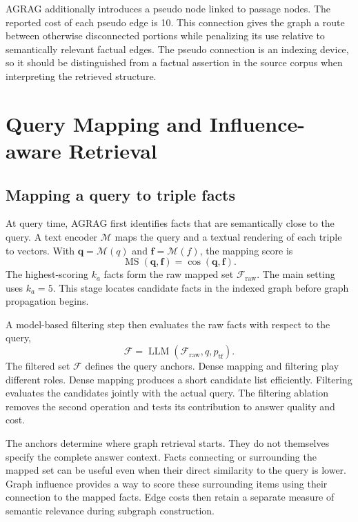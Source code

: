 AGRAG additionally introduces a pseudo node linked to passage nodes. The reported cost of each pseudo edge is 10. This connection gives the graph a route between otherwise disconnected portions while penalizing its use relative to semantically relevant factual edges. The pseudo connection is an indexing device, so it should be distinguished from a factual assertion in the source corpus when interpreting the retrieved structure.

\section{Query Mapping and Influence-aware Retrieval}
\label{sec:agrag:influence}
\subsection{Mapping a query to triple facts}
At query time, AGRAG first identifies facts that are semantically close to the query. A text encoder $\mathcal{M}$ maps the query and a textual rendering of each triple to vectors. With $\mathbf{q}=\mathcal{M}(q)$ and $\mathbf{f}=\mathcal{M}(f)$, the mapping score is
\begin{equation}
\operatorname{MS}(\mathbf{q},\mathbf{f})=
\cos(\mathbf{q},\mathbf{f}).
\label{eq:agrag:mapping}
\end{equation}
The highest-scoring $k_a$ facts form the raw mapped set $\mathcal{F}_{\mathrm{raw}}$. The main setting uses $k_a=5$. This stage locates candidate facts in the indexed graph before graph propagation begins.

A model-based filtering step then evaluates the raw facts with respect to the query,
\begin{equation}
\mathcal{F}=\operatorname{LLM}(\mathcal{F}_{\mathrm{raw}},q,p_{\mathrm{tf}}).
\label{eq:agrag:filter}
\end{equation}
The filtered set $\mathcal{F}$ defines the query anchors. Dense mapping and filtering play different roles. Dense mapping produces a short candidate list efficiently. Filtering evaluates the candidates jointly with the actual query. The filtering ablation removes the second operation and tests its contribution to answer quality and cost.

The anchors determine where graph retrieval starts. They do not themselves specify the complete answer context. Facts connecting or surrounding the mapped set can be useful even when their direct similarity to the query is lower. Graph influence provides a way to score these surrounding items using their connection to the mapped facts. Edge costs then retain a separate measure of semantic relevance during subgraph construction.

